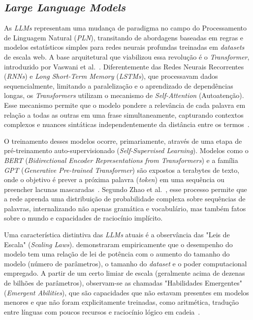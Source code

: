 \documentclass[12pt, a4paper]{article}
\numberwithin{equation}{section}
\begin{document}
\subsection{\textit{Large Language Models}}

As \textit{LLMs} representam uma mudança de paradigma no campo do Processamento de Linguagem Natural (\textit{PLN}), transitando de abordagens baseadas em regras e modelos estatísticos simples para redes neurais profundas treinadas em \textit{datasets} de escala web. A base arquitetural que viabilizou essa revolução é o \textit{Transformer}, introduzido por Vaswani et al.~\cite{vaswani2017Attention}. Diferentemente das Redes Neurais Recorrentes (\textit{RNNs}) e \textit{Long Short-Term Memory} (\textit{LSTMs}), que processavam dados sequencialmente, limitando a paralelização e o aprendizado de dependências longas, os \textit{Transformers} utilizam o mecanismo de \textit{Self-Attention} (Autoatenção). Esse mecanismo permite que o modelo pondere a relevância de cada palavra em relação a todas as outras em uma frase simultaneamente, capturando contextos complexos e nuances sintáticas independentemente da distância entre os termos~\cite{vaswani2017Attention}.

O treinamento desses modelos ocorre, primariamente, através de uma etapa de pré-treinamento auto-supervisionado (\textit{Self-Supervised Learning}). Modelos como o \textit{BERT} (\textit{Bidirectional Encoder Representations from Transformers}) e a família \textit{GPT} (\textit{Generative Pre-trained Transformer}) são expostos a terabytes de texto, onde o objetivo é prever a próxima palavra (\textit{token}) em uma sequência ou preencher lacunas mascaradas~\cite{devlin2018bert, brown2020language}. Segundo Zhao et al.~\cite{zhao2023Survey}, esse processo permite que a rede aprenda uma distribuição de probabilidade complexa sobre sequências de palavras, internalizando não apenas gramática e vocabulário, mas também fatos sobre o mundo e capacidades de raciocínio implícito.

Uma característica distintiva das \textit{LLMs} atuais é a observância das "Leis de Escala" (\textit{Scaling Laws}).  demonstraram empiricamente que o desempenho do modelo tem uma relação de lei de potência com o aumento do tamanho do modelo (número de parâmetros), o tamanho do \textit{dataset} e o poder computacional empregado. A partir de um certo limiar de escala (geralmente acima de dezenas de bilhões de parâmetros), observam-se as chamadas "Habilidades Emergentes" (\textit{Emergent Abilities}), que são capacidades que não estavam presentes em modelos menores e que não foram explicitamente treinadas, como aritmética, tradução entre línguas com poucos recursos e raciocínio lógico em cadeia~\cite{wei2022emergent}.
\end{document}
